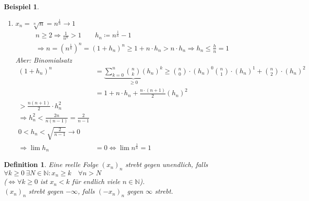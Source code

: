 \documentclass[11pt, twoside, a4paper]{article}
\theoremstyle{plain}
\newtheorem{definition}[blockelement]{Definition}
\newtheorem{beispiel}[blockelement]{Beispiel}
\newcommand{\pair}[1]{\left(#1\right)}
\newcommand{\abs}[1]{\left|#1\right|}
\newcommand{\equivalent}[0]{\Leftrightarrow{}}
\newcommand{\impl}[0]{\Rightarrow{}}
\newcommand{\definedas}[0]{\coloneqq}
\newcommand{\fromto}{\rightarrow{}}
\newcommand{\naturalnumbers}{\mathbb{N}}
\begin{document}
\begin{beispiel}
\begin{enumerate}
            $\abs{a^\frac{1}{n}-1} = h_n < \frac{a}{n}\impl \lim a^\frac{1}{n}= 1$\\
            3. Fall $0<a<1$\\
            \begin{align*}
                b &= \frac{1}{a} > 1\\
                \impl \lim b^\frac{1}{n} &= 1\\
                &=\lim \frac{1}{a^\frac{1}{n}} &\impl \lim a^{\frac{1}{n}} = 1
            \end{align*}
            \item $x_n = \sqrt[n]{n} = n^\frac{1}{n}\fromto 1$
            \begin{align*}
                n \geq 2 \impl \frac{1}{n^n} > 1\qquad h_n \definedas n^{\frac{1}{n}} - 1\\
                \impl n = \pair{n^\frac{1}{n}}^n = \pair{1+h_n}^n \geq 1+n\cdot h_n > n\cdot h_n \impl h_n \leq \frac{h}{n} = 1
            \end{align*}
            Aber: Binomialsatz
            \begin{align*}
                \pair{1+h_n}^n &= \underbrace{\sum_{k=0}^{n} \binom{n}{k}\pair{h_n}^k}_{\geq 0} \geq \binom{n}{0}\cdot \pair{h_n}^0 \binom{n}{1}\cdot \pair{h_n}^1 + \binom{n}{2}\cdot \pair{h_n}^2\\
                &= 1 + n\cdot h_n + \frac{n\cdot(n+1)}{2}(h_n)^2\\
                > \frac{n(n+1)}{2}\cdot h_n^2\\
                \impl h_n^2 < \frac{2n}{n(n-1)} = \frac{2}{n-1}\\
                0 < h_n < \sqrt{\frac{2}{n-1}} \fromto 0\\
                \impl \lim h_n &= 0 \equivalent \lim n^{\frac{1}{n}} = 1
            \end{align*}
        \end{enumerate}
    \end{beispiel}

    \begin{definition}
        Eine reelle Folge $(x_n)_n$ strebt gegen unendlich, falls $\forall k \geq 0~\exists N\in\naturalnumbers\colon x_n \geq k\quad \forall n> N$\\
        ($\equivalent \forall k \geq 0$ ist $x_n < k$ für endlich viele $n\in\naturalnumbers$).\\
        $(x_n)_n$ strebt gegen $-\infty$, falls $(-x_n)_n$ gegen $\infty$ strebt.
    \end{definition}
\end{document}
